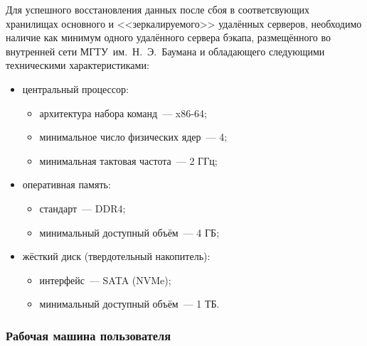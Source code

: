 \documentclass{bmstu}
\begin{document}
  Для успешного восстановления данных после сбоя в соответсвующих хранилищах основного и <<зеркалируемого>> удалённых серверов, необходимо наличие как минимум одного удалённого сервера бэкапа, размещённого во внутренней сети МГТУ~им.~Н.~Э.~Баумана и обладающего
  следующими техническими характеристиками:
  \begin{itemize}[label=---]
  	\item центральный процессор:
  	\begin{itemize}[label=---]
  		\item архитектура набора команд~--- x86-64;
  		\item минимальное число физических ядер~--- 4;
  		\item минимальная тактовая частота~--- 2 ГГц;
  	\end{itemize}
  	\item оперативная память:
  	\begin{itemize}[label=---]
  		\item стандарт~--- DDR4;
  		\item минимальный доступный объём~--- 4 ГБ;
  	\end{itemize}
  	\item жёсткий диск (твердотельный накопитель):
  	\begin{itemize}[label=---]
  		\item интерфейс~--- SATA (NVMe);
  		\item минимальный доступный объём~--- 1 ТБ.
  	\end{itemize}
  \end{itemize}

  \subsubsection{Рабочая машина пользователя}
\end{document}
